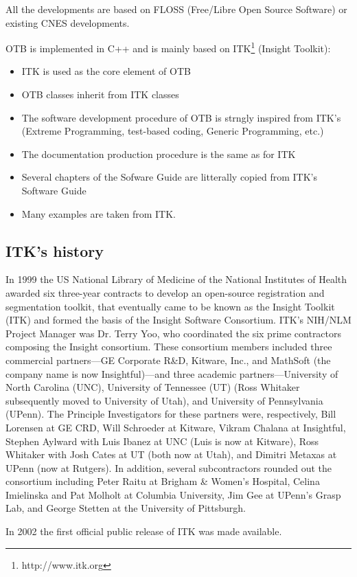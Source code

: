 All the developments are based on FLOSS (Free/Libre Open Source
Software) or existing CNES developments.

OTB is implemented in C++ and is mainly based on
ITK\footnote{http://www.itk.org} (Insight Toolkit):
\begin{itemize}
  \item ITK is used as the core element of OTB
  \item OTB classes inherit from ITK classes
  \item The software development procedure of OTB is strngly inspired
  from ITK's (Extreme Programming, test-based coding, Generic
  Programming, etc.)
  \item The documentation production procedure is the same as for ITK
  \item Several chapters of the Sofware Guide are litterally copied
  from ITK's Software Guide
  \item Many examples are taken from ITK.
\end{itemize}

\subsection{ITK's history}
      
In 1999 the US National Library of Medicine of the National Institutes of
Health awarded six three-year contracts to develop an open-source
registration and segmentation toolkit, that eventually came to be known as
the Insight Toolkit (ITK) and formed the basis of the Insight Software
Consortium. ITK's NIH/NLM Project Manager was Dr. Terry Yoo, who coordinated the
six prime contractors composing the Insight consortium. These consortium
members included three commercial partners---GE Corporate R\&D, Kitware,
Inc., and MathSoft (the company name is now Insightful)---and three academic
partners---University of North Carolina (UNC), University of Tennessee (UT)
(Ross Whitaker subsequently moved to University of Utah), and University of
Pennsylvania (UPenn). The Principle Investigators for these partners were,
respectively, Bill Lorensen at GE CRD, Will Schroeder at Kitware, Vikram
Chalana at Insightful, Stephen Aylward with Luis Ibanez at UNC (Luis is now
at Kitware), Ross Whitaker with Josh Cates at UT (both now at Utah), and
Dimitri Metaxas at UPenn (now at Rutgers). In addition, several
subcontractors rounded out the consortium including Peter Raitu at Brigham \&
Women's Hospital, Celina Imielinska and Pat Molholt at Columbia University,
Jim Gee at UPenn's Grasp Lab, and George Stetten at the University of
Pittsburgh.

In 2002 the first official public release of ITK was made
available. 

   	


